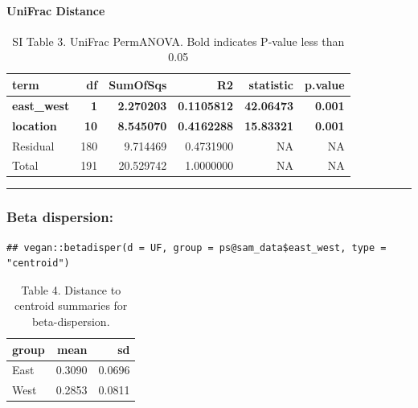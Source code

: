 \documentclass[
]{article}
\begin{document}
\hypertarget{unifrac-distance}{%
\paragraph{UniFrac Distance}\label{unifrac-distance}}

\begin{table}

\caption{\label{tab:unnamed-chunk-4}SI Table 3. UniFrac PermANOVA. Bold indicates P-value less than 0.05}
\centering
\begin{tabular}[t]{l|r|r|r|r|r}
\hline
term & df & SumOfSqs & R2 & statistic & p.value\\
\hline
\textbf{east\_west} & \textbf{1} & \textbf{2.270203} & \textbf{0.1105812} & \textbf{42.06473} & \textbf{0.001}\\
\hline
\textbf{location} & \textbf{10} & \textbf{8.545070} & \textbf{0.4162288} & \textbf{15.83321} & \textbf{0.001}\\
\hline
Residual & 180 & 9.714469 & 0.4731900 & NA & NA\\
\hline
Total & 191 & 20.529742 & 1.0000000 & NA & NA\\
\hline
\end{tabular}
\end{table}

\begin{center}\rule{0.5\linewidth}{0.5pt}\end{center}

\hypertarget{beta-dispersion}{%
\subsubsection{Beta dispersion:}\label{beta-dispersion}}

\begin{verbatim}
## vegan::betadisper(d = UF, group = ps@sam_data$east_west, type = "centroid")
\end{verbatim}

\begin{table}

\caption{\label{tab:unnamed-chunk-5}Table 4. Distance to centroid summaries for beta-dispersion.}
\centering
\begin{tabular}[t]{l|r|r}
\hline
group & mean & sd\\
\hline
East & 0.3090 & 0.0696\\
\hline
West & 0.2853 & 0.0811\\
\hline
\end{tabular}
\end{table}
\end{document}
